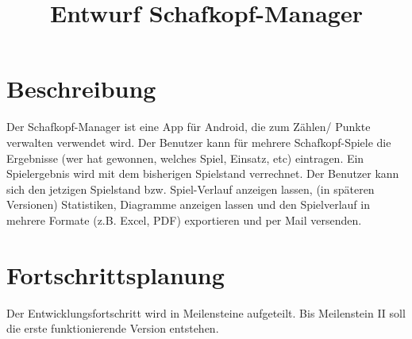 \documentclass[10pt,a4paper]{article}
\begin{document}
	\title{Entwurf Schafkopf-Manager}
	\section{Beschreibung}
	Der Schafkopf-Manager ist eine App für Android, die zum Zählen/ Punkte verwalten verwendet wird. Der Benutzer kann für mehrere Schafkopf-Spiele die Ergebnisse (wer hat gewonnen, welches Spiel, Einsatz, etc) eintragen. Ein Spielergebnis wird mit dem bisherigen Spielstand verrechnet. Der Benutzer kann sich den jetzigen Spielstand bzw. Spiel-Verlauf anzeigen lassen, (in späteren Versionen) Statistiken, Diagramme anzeigen lassen und den Spielverlauf in mehrere Formate (z.B. Excel, PDF) exportieren und per Mail versenden.
	
	\section{Fortschrittsplanung}
	Der Entwicklungsfortschritt wird in Meilensteine aufgeteilt. Bis Meilenstein II soll die erste funktionierende Version entstehen.\\
	\\
\end{document}
